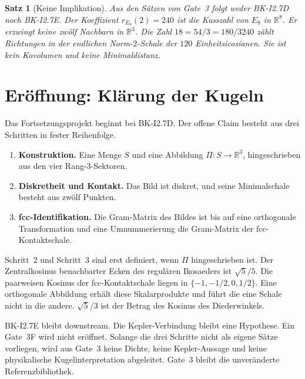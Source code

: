 \documentclass[11pt,a4paper]{article}
\newtheorem{theorem}{Satz}[section]
\begin{document}
\begin{theorem}[Keine Implikation]
  Aus den S\"atzen von Gate~3 folgt weder BK-I2.7D noch BK-I2.7E.
  Der Koeffizient $r_{E_8}(2)=240$ ist die Kusszahl von $E_8$ in
  $\mathbb{R}^8$. Er erzwingt keine zw\"olf Nachbarn in
  $\mathbb{R}^3$. Die Zahl $18=54/3=180/3240$ z\"ahlt Richtungen in
  der endlichen Norm-$2$-Schale der $120$ Einheitsicosianen. Sie ist
  kein Kovolumen und keine Minimaldistanz.
\end{theorem}

\section{Er\"offnung: Kl\"arung der Kugeln}

Das Fortsetzungsprojekt beginnt bei BK-I2.7D. Der offene Claim besteht
aus drei Schritten in fester Reihenfolge.
\begin{enumerate}
  \item \textbf{Konstruktion.}
  Eine Menge $S$ und eine Abbildung $\Pi:S\to\mathbb{R}^3$,
  hingeschrieben aus den vier Rang-$3$-Sektoren.
  \item \textbf{Diskretheit und Kontakt.}
  Das Bild ist diskret, und seine Minimalschale besteht aus zw\"olf
  Punkten.
  \item \textbf{fcc-Identifikation.}
  Die Gram-Matrix des Bildes ist bis auf eine orthogonale
  Transformation und eine Umnummerierung die Gram-Matrix der
  fcc-Kontaktschale.
\end{enumerate}
Schritt~2 und Schritt~3 sind erst definiert, wenn $\Pi$ hingeschrieben
ist. Der Zentralkosinus benachbarter Ecken des regul\"aren Ikosaeders
ist $\sqrt{5}/5$. Die paarweisen Kosinus der fcc-Kontaktschale liegen
in $\{-1,-1/2,0,1/2\}$. Eine orthogonale Abbildung erh\"alt diese
Skalarprodukte und f\"uhrt die eine Schale nicht in die andere.
$\sqrt{5}/3$ ist der Betrag des Kosinus des Diederwinkels.

BK-I2.7E bleibt downstream. Die Kepler-Verbindung bleibt eine Hypothese.
Ein Gate~3F wird nicht er\"offnet. Solange die drei Schritte nicht als
eigene S\"atze vorliegen, wird aus Gate~3 keine Dichte, keine
Kepler-Aussage und keine physikalische Kugelinterpretation abgeleitet.
Gate~3 bleibt die unver\"anderte Referenzbibliothek.
\end{document}
